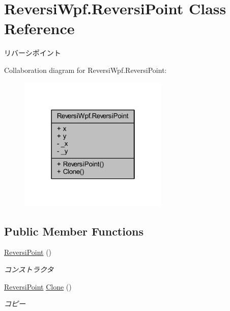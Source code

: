 \hypertarget{class_reversi_wpf_1_1_reversi_point}{}\section{Reversi\+Wpf.\+Reversi\+Point Class Reference}
\label{class_reversi_wpf_1_1_reversi_point}


リバーシポイント  




Collaboration diagram for Reversi\+Wpf.\+Reversi\+Point\+:\nopagebreak
\begin{figure}[H]
\begin{center}
\leavevmode
\includegraphics[width=202pt]{class_reversi_wpf_1_1_reversi_point__coll__graph}
\end{center}
\end{figure}
\subsection*{Public Member Functions}
\begin{DoxyCompactItemize}
\item 
\hyperlink{class_reversi_wpf_1_1_reversi_point_ae49762ebfdde4cf38173f7e2d97caf56}{Reversi\+Point} ()
\begin{DoxyCompactList}\small\item\em コンストラクタ \end{DoxyCompactList}\item 
\hyperlink{class_reversi_wpf_1_1_reversi_point}{Reversi\+Point} \hyperlink{class_reversi_wpf_1_1_reversi_point_abced863ae8c3a9d22d813e290c0340b0}{Clone} ()
\begin{DoxyCompactList}\small\item\em コピー \end{DoxyCompactList}\end{DoxyCompactItemize}
